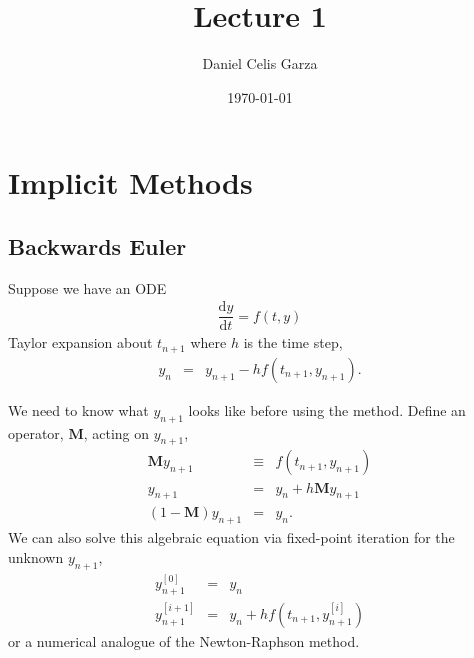 \documentclass[10pt,a4paper]{article}
\begin{document}
	\title{Lecture 1}
	\author{Daniel Celis Garza}
	\date{\today}
	\maketitle
	\section{Implicit Methods}
	
	\subsection{Backwards Euler}
	Suppose we have an ODE
	\begin{eqnarray}
		\dfrac{\mathrm{d}y}{\mathrm{d}t} = f(t,y)
	\end{eqnarray}
	Taylor expansion about $t_{n+1}$ where $h$ is the time step,
	\begin{eqnarray}\label{eq:backeul}
		y_{n} &=& y_{n+1} - h f(t_{n+1},y_{n+1}).
	\end{eqnarray}
	
	We need to know what $y_{n+1}$ looks like before using the method. Define an operator, $\mathbf{M}$, acting on $y_{n+1}$,	
	\begin{eqnarray}
		\mathbf{M} y_{n+1} &\equiv& f(t_{n+1}, y_{n+1}) \\
		y_{n+1} &=& y_{n} + h \mathbf{M} y_{n+1} \\
		(1 - \mathbf{M}) y_{n+1} &=& y_{n}.
	\end{eqnarray}
	We can also solve this algebraic equation via fixed-point iteration for the unknown $y_{n+1}$,
	\begin{eqnarray}
		y_{n+1}^{[0]} &=& y_{n} \\
		y_{n+1}^{[i+1]} &=& y_{n} + h f(t_{n+1},y_{n+1}^{[i]})
	\end{eqnarray}
	or a numerical analogue of the Newton-Raphson method.
	
\end{document}
